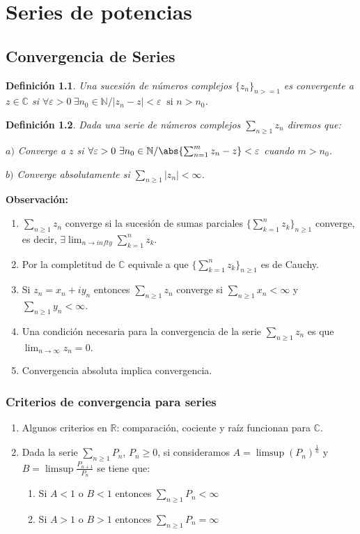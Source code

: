 \documentclass[10pt]{book}
\newtheorem{defi}{Definición}[chapter]
\newcommand{\R}{\mathbb{R}}
\newcommand{\C}{\mathbb{C}}
\newcommand{\N}{\mathbb{N}}
\begin{document}
\chapter{Series de potencias}
\section{Convergencia de Series}
\begin{defi}
Una sucesión de números complejos $\{z_n\}_{n>=1}$ es convergente a $z\in\C$ si $\forall\varepsilon>0 \ \exists n_0\in\N / |z_n-z|<\varepsilon\ \text{ si } n>n_0$.
\end{defi}

\begin{defi}
Dada una serie de números complejos $\sum_{n\geq 1} z_n$ diremos que:

$a)$ Converge a $z$ si $\forall \varepsilon>0\ \exists n_0\in\N / \abs{\sum_{n=1}^mz_n-z} <\varepsilon$ cuando $m> n_0$.

$b)$ Converge absolutamente si $\sum_{n\geq 1} |z_n| < \infty$.
\end{defi}
\textbf{Observación:}
\begin{enumerate}
\item $\sum_{n\geq 1} z_n$ converge si la sucesión de sumas parciales $\{\sum_{k=1}^n z_k\}_{n\geq 1}$ converge, es decir, $\exists \lim_{n\to infty}\sum_{k=1}^n z_k$.
\item Por la completitud de $\C$ equivale a que $\{\sum_{k=1}^n z_k\}_{n\geq 1}$ es de Cauchy.
\item Si $z_n = x_n + iy_n$ entonces $\sum_{n\geq 1} z_n$ converge si $\sum_{n\geq 1} x_n < \infty$  y $\sum_{n\geq 1} y_n<\infty$.
\item Una condición necesaria para la convergencia de la serie $\sum_{n\geq 1} z_n$ es que $\lim_{n\to \infty} z_n = 0$.
\item Convergencia absoluta implica convergencia.
\end{enumerate}

\subsection{Criterios de convergencia para series}

\begin{enumerate}
\item Algunos criterios en $\R$: comparación, cociente y raíz funcionan para $\C$.
\item Dada la serie $\sum_{n\geq 1} P_n$, $P_n\geq 0$, si consideramos $A = \limsup(P_n)^{\frac{1}{n}}$ y $B = \limsup\frac{P_{n+1}}{P_n}$ se tiene que:
	\begin{enumerate}
	\item Si $A <1$ o $B<1$ entonces $\sum_{n\geq 1} P_n< \infty$
	\item Si $A >1$ o $B>1$ entonces $\sum_{n\geq 1} P_n= \infty$
	\end{enumerate}
\end{enumerate}
\end{document}
